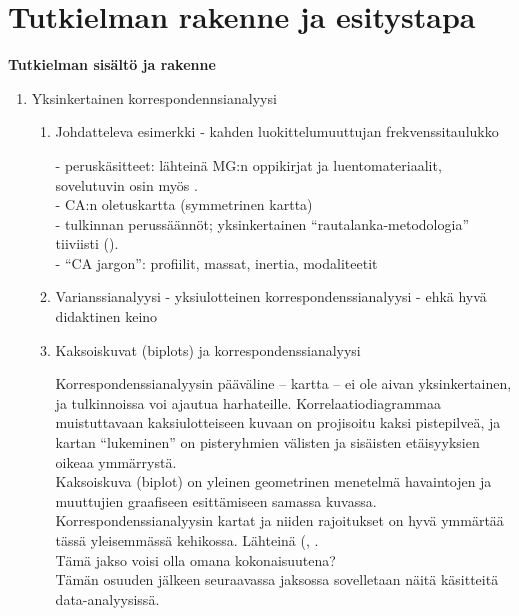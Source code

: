 \section{Tutkielman rakenne ja esitystapa}
\label{disprakenne1}

\textbf {Tutkielman sisältö ja rakenne}

\begin{enumerate} %

\item Yksinkertainen korrespondennsianalyysi

\begin{enumerate} %

\item Johdatteleva esimerkki - kahden luokittelumuuttujan frekvenssitaulukko

- peruskäsitteet: lähteinä MG:n oppikirjat ja luentomateriaalit, sovelutuvin osin myös \cite{RefWorks:68}. \\

- CA:n oletuskartta (symmetrinen kartta)\\

- tulkinnan perussäännöt; yksinkertainen ``rautalanka-metodologia'' tiiviisti (\cite{RefWorks:68}).\\
- ``CA jargon'': profiilit, massat, inertia, modaliteetit\\

\item Varianssianalyysi - yksiulotteinen korrespondenssianalyysi
- ehkä hyvä didaktinen keino

\item Kaksoiskuvat (biplots) ja korrespondenssianalyysi

Korrespondenssianalyysin pääväline -- kartta -- ei ole aivan yksinkertainen, ja tulkinnoissa voi ajautua harhateille. Korrelaatiodiagrammaa muistuttavaan kaksiulotteiseen kuvaan on projisoitu kaksi pistepilveä, ja kartan ``lukeminen'' on pisteryhmien välisten ja sisäisten etäisyyksien oikeaa ymmärrystä.\\

Kaksoiskuva (biplot) on yleinen geometrinen menetelmä havaintojen ja muuttujien graafiseen esittämiseen samassa kuvassa. Korrespondenssianalyysin kartat ja niiden rajoitukset on hyvä ymmärtää tässä yleisemmässä kehikossa. Lähteinä (\cite{RefWorks:56}, \cite{RefWorks:73}.\\
Tämä jakso voisi olla omana kokonaisuutena?\\
Tämän osuuden jälkeen seuraavassa jaksossa sovelletaan näitä käsitteitä data-analyysissä.


\end{enumerate}
\end{enumerate}
